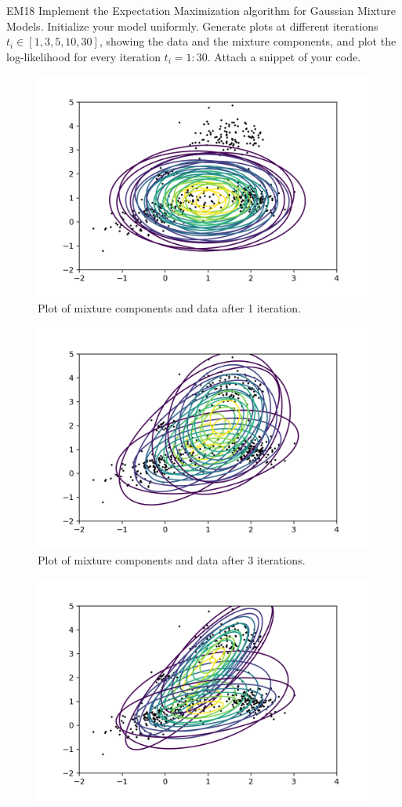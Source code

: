 \begin{questions}
\begin{question}{EM}{18}
Implement the Expectation Maximization algorithm for Gaussian Mixture Models. Initialize your model uniformly. Generate plots at different iterations $t_i \in [1,3,5,10,30]$, showing the data and the mixture components, and plot the log-likelihood for every iteration $t_i=1:30$. Attach a snippet of your code.
\begin{figure}[]
	\includegraphics[width=0.8\linewidth]{pictures/em_iter_1.png}
	\centering
	\caption{Plot of mixture components and data after 1 iteration.}
	\label{fig:1}
\end{figure}
\begin{figure}[]
	\includegraphics[width=0.8\linewidth]{pictures/em_iter_3.png}
	\centering
	\caption{Plot of mixture components and data after 3 iterations.}
	\label{fig:2}
\end{figure}
\begin{figure}[]
	\includegraphics[width=0.8\linewidth]{pictures/em_iter_5.png}

\end{figure}
\end{question}
\end{questions}
